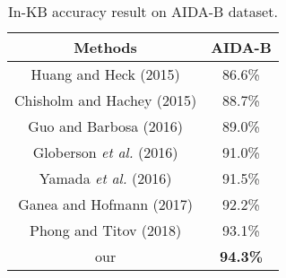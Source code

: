\documentclass[sigconf]{acmart}
\begin{document}
\begin{table}[tp]
\caption{In-KB accuracy result on AIDA-B dataset.}
\renewcommand\arraystretch{1}
\newcommand{\tabincell}[2]{\begin{tabular}{@{}#1@{}}#2\end{tabular}}
\centering
\begin{tabular}{|c|c|} 
\hline  
{Methods}  & {AIDA-B} \\
\hline  
Huang and Heck (2015)\cite{HuangHJ15}  & 86.6\%  \\
\hline  
Chisholm and Hachey (2015)\cite{ChisholmH15}  & 88.7\%  \\
\hline 
Guo and Barbosa (2016)\cite{GuoB18}  & 89.0\%  \\
\hline 
Globerson \emph{et al.} (2016)\cite{GlobersonLCSRP16}  & 91.0\%  \\
\hline 
Yamada \emph{et al.} (2016)\cite{YamadaS0T16}  & 91.5\%  \\
\hline 
Ganea and Hofmann (2017)\cite{GaneaH17}  & 92.2\%  \\
\hline 
Phong and Titov (2018)\cite{TitovL18a}  & 93.1\%  \\
\hline
our  & {\bfseries 94.3\%}  \\
\hline  
\end{tabular}
\setlength{\abovecaptionskip}{8pt}
\end{table}
\end{document}
